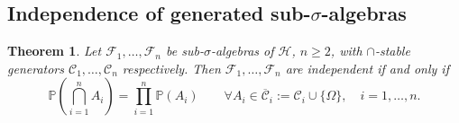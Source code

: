 \documentclass[11pt, a4paper, openany]{book}
\newtheorem{thm}{Theorem}\newtheorem{lem}{Lemma}\newtheorem{crl}{Corollary}
\theoremstyle{definition}
\begin{document}
\subsection{Independence of generated sub-\texorpdfstring{$\sigma$}{sigma}-algebras}
    \begin{thm}\label{independence of generated sub sigma algebras}
        Let $\mathscr{F}_1,\dots,\mathscr{F}_n$ be sub-$\sigma$-algebras of $\mathscr{H}$, $n\geqslant 2$, with $\cap$-stable generators $\mathscr{C}_1,\dots,\mathscr{C}_n$ respectively.
        Then $\mathscr{F}_1,\dots,\mathscr{F}_n$ are independent if and only if
        \begin{equation}\label{eq:independence-generators}
            \mathbb{P}\left(\bigcap_{i=1}^n A_i\right)
            =
            \prod_{i=1}^n\mathbb{P}(A_i)
            \qquad
            \forall A_i\in\overline{\mathscr{C}}_i:=\mathscr{C}_i\cup\{\Omega\},\quad
            i=1,\dots,n.
        \end{equation}
    \end{thm}
\end{document}
